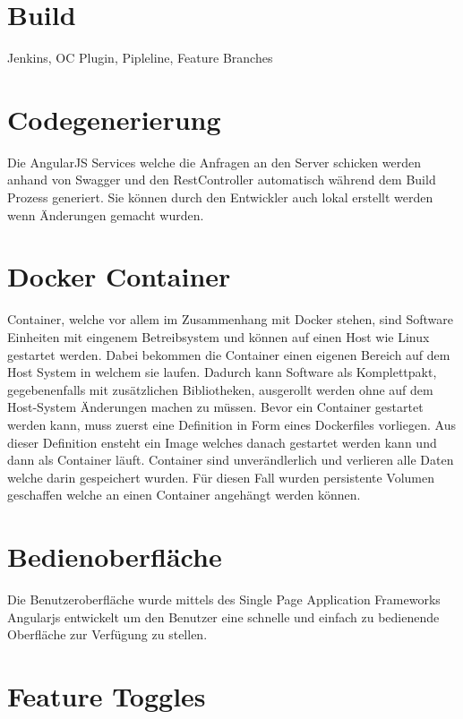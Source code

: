 \section{Build}

Jenkins, OC Plugin, Pipleline, Feature Branches

\section{Codegenerierung}

Die AngularJS Services welche die Anfragen an den Server schicken werden anhand von Swagger und den RestController automatisch während dem Build Prozess generiert. Sie können durch den Entwickler auch lokal erstellt werden wenn Änderungen gemacht wurden.

\section{Docker Container}
\label{container}
Container, welche vor allem im Zusammenhang mit Docker stehen, sind Software Einheiten mit eingenem Betreibsystem und können auf einen Host wie Linux gestartet werden. Dabei bekommen die Container einen eigenen Bereich auf dem Host System in welchem sie laufen. Dadurch kann Software als Komplettpakt, gegebenenfalls mit zusätzlichen Bibliotheken, ausgerollt werden ohne auf dem Host-System Änderungen machen zu müssen. \newline
Bevor ein Container gestartet werden kann, muss zuerst eine Definition in Form eines Dockerfiles vorliegen. Aus dieser Definition ensteht ein Image welches danach gestartet werden kann und dann als Container läuft. Container sind unverändlerlich und verlieren alle Daten welche darin gespeichert wurden. Für diesen Fall wurden persistente Volumen geschaffen welche an einen Container angehängt werden können.

\section{Bedienoberfläche}

Die Benutzeroberfläche wurde mittels des Single Page Application Frameworks Angularjs entwickelt um den Benutzer eine schnelle und einfach zu bedienende Oberfläche zur Verfügung zu stellen. 

\section{Feature Toggles}

